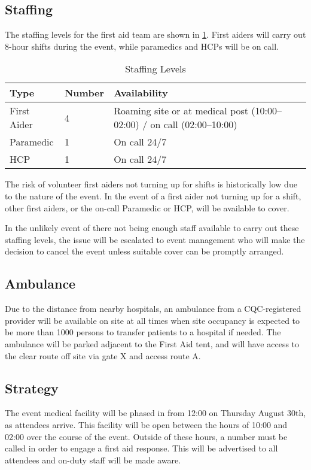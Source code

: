 \subsection{Staffing}

The staffing levels for the first aid team are shown in \cref{table:fastaffing}.
First aiders will carry out 8-hour shifts during the event, while paramedics
and HCPs will be on call.

\begin{table}[h!]
\caption{Staffing Levels}
\label{table:fastaffing}
\centering
\begin{tabular}{| l l l |}
    \hline
        \textbf{Type} & \textbf{Number} & \textbf{Availability} \\
    \hline
        First Aider & 4 & Roaming site or at medical post (10:00--02:00) / on call (02:00--10:00) \\
        Paramedic & 1 & On call 24/7 \\
        HCP & 1 & On call 24/7 \\
    \hline
\end{tabular}
\end{table}

The risk of volunteer first aiders not turning up for shifts is historically low due
to the nature of the event. In the event of a first aider not turning up for a shift,
other first aiders, or the on-call Paramedic or HCP, will be available to cover.

In the unlikely event of there not being enough staff available to carry out these
staffing levels, the issue will be escalated to event management who will make the
decision to cancel the event unless suitable cover can be promptly arranged.

\subsection{Ambulance}

Due to the distance from nearby hospitals, an ambulance from a CQC-registered provider 
will be available on site at all times when site occupancy is expected to be more than
1000 persons to transfer patients to a hospital if needed. The ambulance will be parked
adjacent to the First Aid tent, and will have access to the clear route off site via gate
X and access route A.

\subsection{Strategy}
The event medical facility will be phased in from 12:00 on Thursday August 30th,
as attendees arrive. This facility will be open between the hours of 10:00 and 02:00
over the course of the event. Outside of these hours, a number must be called in
order to engage a first aid response. This will be advertised to all attendees and
on-duty staff will be made aware.

